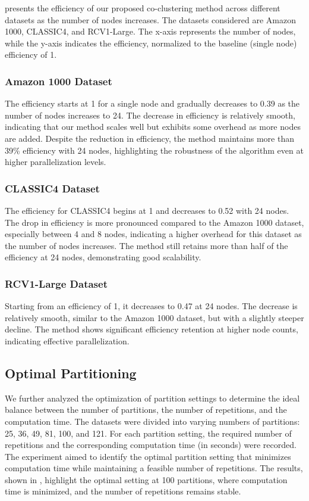 \documentclass[journal]{IEEEtran}
\begin{document}
 presents the efficiency of our proposed co-clustering method across different datasets as the number of nodes increases. The datasets considered are Amazon 1000, CLASSIC4, and RCV1-Large. The x-axis represents the number of nodes, while the y-axis indicates the efficiency, normalized to the baseline (single node) efficiency of 1.

\subsubsection{Amazon 1000 Dataset}
The efficiency starts at 1 for a single node and gradually decreases to 0.39 as the number of nodes increases to 24. The decrease in efficiency is relatively smooth, indicating that our method scales well but exhibits some overhead as more nodes are added. Despite the reduction in efficiency, the method maintains more than 39\% efficiency with 24 nodes, highlighting the robustness of the algorithm even at higher parallelization levels.

\subsubsection{CLASSIC4 Dataset}
The efficiency for CLASSIC4 begins at 1 and decreases to 0.52 with 24 nodes. The drop in efficiency is more pronounced compared to the Amazon 1000 dataset, especially between 4 and 8 nodes, indicating a higher overhead for this dataset as the number of nodes increases. The method still retains more than half of the efficiency at 24 nodes, demonstrating good scalability.

\subsubsection{RCV1-Large Dataset}
Starting from an efficiency of 1, it decreases to 0.47 at 24 nodes. The decrease is relatively smooth, similar to the Amazon 1000 dataset, but with a slightly steeper decline. The method shows significant efficiency retention at higher node counts, indicating effective parallelization.

\subsection{Optimal Partitioning}

We further analyzed the optimization of partition settings to determine the ideal balance between the number of partitions, the number of repetitions, and the computation time. The datasets were divided into varying numbers of partitions: 25, 36, 49, 81, 100, and 121. For each partition setting, the required number of repetitions and the corresponding computation time (in seconds) were recorded. The experiment aimed to identify the optimal partition setting that minimizes computation time while maintaining a feasible number of repetitions. The results, shown in , highlight the optimal setting at 100 partitions, where computation time is minimized, and the number of repetitions remains stable.
\end{document}
